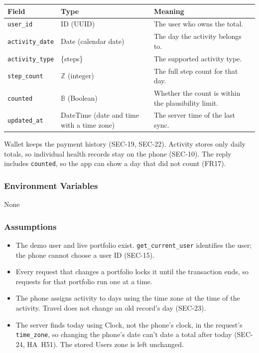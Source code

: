 \documentclass[12pt, titlepage]{article}
\begin{document}
\begin{center}
\begin{tabular}{>{\raggedright\arraybackslash}p{3.5cm}
  >{\raggedright\arraybackslash}p{4.4cm}
  >{\raggedright\arraybackslash}p{6.6cm}}
\toprule
\textbf{Field} & \textbf{Type} & \textbf{Meaning} \\
\midrule
\texttt{user\_id} & ID (UUID) & The user who owns the total. \\
\texttt{activity\_date} & Date (calendar date) & The day the activity belongs to. \\
\texttt{activity\_type} & \{steps\} & The supported activity type. \\
\texttt{step\_count} & $\mathbb{Z}$ (integer) & The full step count for that day. \\
\texttt{counted} & $\mathbb{B}$ (Boolean) & Whether the count is within the plausibility limit. \\
\texttt{updated\_at} & DateTime (date and time with a time zone) & The server time of the last sync. \\
\bottomrule
\end{tabular}
\end{center}


\medskip
\noindent Wallet keeps the payment history (SEC-19, SEC-22). Activity stores
only daily totals, so individual health records stay on the phone (SEC-10).
The reply includes \texttt{counted}, so the app can show a day that did not
count (FR17).


\subsubsection{Environment Variables}

None

\subsubsection{Assumptions}

\begin{itemize}
\item The demo user and live portfolio exist. \texttt{get\_current\_user} identifies
  the user; the phone cannot choose a user ID (SEC-15).
\item Every request that changes a portfolio locks it until the transaction
  ends, so requests for that portfolio run one at a time.
\item The phone assigns activity to days using the time zone at the time of
  the activity. Travel does not change an old record's day (SEC-23).
\item The server finds today using Clock, not the phone's clock, in the
  request's \texttt{time\_zone}, so changing the phone's date can't date a
  total after today (SEC-24, HA~H51). The stored Users zone is left unchanged.

\end{itemize}
\end{document}
